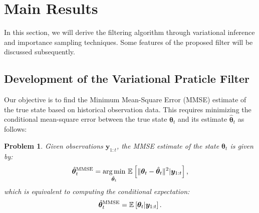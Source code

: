 \documentclass[10pt,twocolumn,twoside]{IEEEtran}
\newtheorem{problem}{Problem}
\newcommand{\argmin}[1]{{\mathop{\arg\min}_{#1}~}}
\newcommand{\E}[2][]{ \mathbb{E}_{#1}\left[#2\right] } %
\newcommand{\cm}{\text{,}} %
\newcommand{\fs}{\text{.}} %
\newcommand{\y}{{ \bm{y} }}
\begin{document}
\section{Main Results} \label{sec:main}
In this section, we will derive the filtering algorithm through variational inference and importance sampling techniques. Some features of the proposed filter will be discussed subsequently.

\subsection{Development of the Variational Praticle Filter}
Our objective is to find the Minimum Mean-Square Error (MMSE) estimate of the true state based on historical observation data. This requires minimizing the conditional mean-square error between the true state $\bm\theta_t$ and its estimate $\hat{\bm\theta}_t$ as follows: 
\begin{problem} \label{prob:MMSE}
Given observations $\y_{1:t}$, the MMSE estimate of the state $\bm\theta_t$ is given by:
\begin{equation*}
    \hat{\bm\theta}_t^{\rm MMSE} = \argmin{\hat{\bm\theta}_t}\E{\Vert\bm\theta_t-\hat{\bm\theta}_t\Vert^2|\y_{1:t}} \cm
\end{equation*}
which is equivalent to computing the conditional expectation:
\begin{equation*}
    \hat{\bm\theta}_t^{\rm MMSE} = \E{\bm\theta_t|\y_{1:t}} \fs
\end{equation*}
\end{problem}
\end{document}
